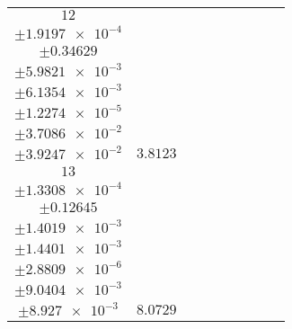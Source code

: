 \documentclass[8pt]{article}
\begin{document}
\begin{longtable}[l]{c c c c c c c c c}
$\num{12}$ & \begin{tabular}[c]{@{}c@{}}$\num{3.1854e-2}$ \\ $\pm\num{1.9197e-4}$\end{tabular} & \begin{tabular}[c]{@{}c@{}}$\num{-0.1013}$ \\ $\pm\num{0.34629}$\end{tabular} & \begin{tabular}[c]{@{}c@{}}$\num{-11.264}$ \\ $\pm\num{5.9821e-3}$\end{tabular} & \begin{tabular}[c]{@{}c@{}}$\num{1.5981e+3}$ \\ $\pm\num{6.1354e-3}$\end{tabular} & \begin{tabular}[c]{@{}c@{}}$\num{3.197}$ \\ $\pm\num{1.2274e-5}$\end{tabular} & \begin{tabular}[c]{@{}c@{}}$\num{5.3476}$ \\ $\pm\num{3.7086e-2}$\end{tabular} & \begin{tabular}[c]{@{}c@{}}$\num{5.5542}$ \\ $\pm\num{3.9247e-2}$\end{tabular} & $\num{3.8123}$\\
$\num{13}$ & \begin{tabular}[c]{@{}c@{}}$\num{5.9961e-2}$ \\ $\pm\num{1.3308e-4}$\end{tabular} & \begin{tabular}[c]{@{}c@{}}$\num{1.1588}$ \\ $\pm\num{0.12645}$\end{tabular} & \begin{tabular}[c]{@{}c@{}}$\num{-7.0303}$ \\ $\pm\num{1.4019e-3}$\end{tabular} & \begin{tabular}[c]{@{}c@{}}$\num{1.6023e+3}$ \\ $\pm\num{1.4401e-3}$\end{tabular} & \begin{tabular}[c]{@{}c@{}}$\num{3.2054}$ \\ $\pm\num{2.8809e-6}$\end{tabular} & \begin{tabular}[c]{@{}c@{}}$\num{3.5658}$ \\ $\pm\num{9.0404e-3}$\end{tabular} & \begin{tabular}[c]{@{}c@{}}$\num{3.5793}$ \\ $\pm\num{8.927e-3}$\end{tabular} & $\num{8.0729}$\\

\end{longtable}
\end{document}
